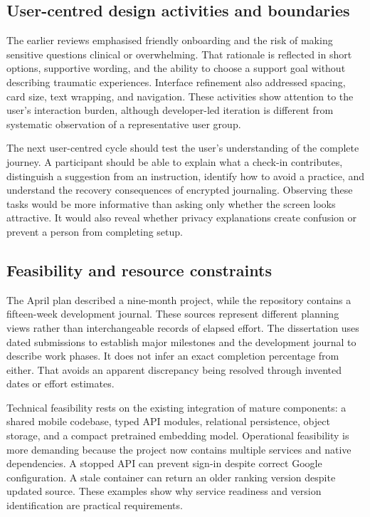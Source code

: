 \subsection{User-centred design activities and boundaries}

The earlier reviews emphasised friendly onboarding and the risk of making sensitive questions clinical or overwhelming. That rationale is reflected in short options, supportive wording, and the ability to choose a support goal without describing traumatic experiences. Interface refinement also addressed spacing, card size, text wrapping, and navigation. These activities show attention to the user's interaction burden, although developer-led iteration is different from systematic observation of a representative user group.

The next user-centred cycle should test the user's understanding of the complete journey. A participant should be able to explain what a check-in contributes, distinguish a suggestion from an instruction, identify how to avoid a practice, and understand the recovery consequences of encrypted journaling. Observing these tasks would be more informative than asking only whether the screen looks attractive. It would also reveal whether privacy explanations create confusion or prevent a person from completing setup.

\subsection{Feasibility and resource constraints}

The April plan described a nine-month project, while the repository contains a fifteen-week development journal. These sources represent different planning views rather than interchangeable records of elapsed effort. The dissertation uses dated submissions to establish major milestones and the development journal to describe work phases. It does not infer an exact completion percentage from either. That avoids an apparent discrepancy being resolved through invented dates or effort estimates.

Technical feasibility rests on the existing integration of mature components: a shared mobile codebase, typed API modules, relational persistence, object storage, and a compact pretrained embedding model. Operational feasibility is more demanding because the project now contains multiple services and native dependencies. A stopped API can prevent sign-in despite correct Google configuration. A stale container can return an older ranking version despite updated source. These examples show why service readiness and version identification are practical requirements.

